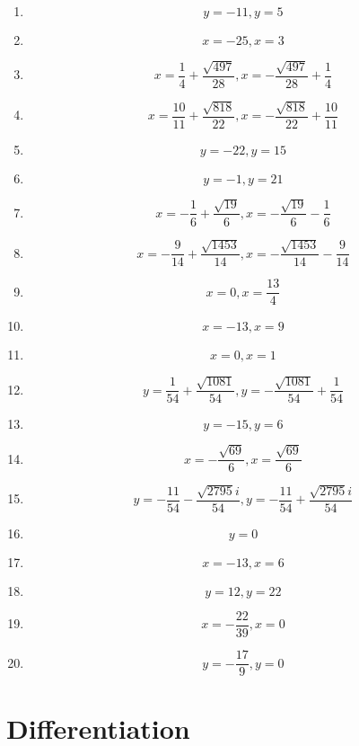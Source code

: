 \documentclass{article}
\begin{document}
        \begin{enumerate}
        \item$$y = -11, y = 5$$
\item$$x = -25, x = 3$$
\item$$x = \frac{1}{4} + \frac{\sqrt{497}}{28}, x = - \frac{\sqrt{497}}{28} + \frac{1}{4}$$
\item$$x = \frac{10}{11} + \frac{\sqrt{818}}{22}, x = - \frac{\sqrt{818}}{22} + \frac{10}{11}$$
\item$$y = -22, y = 15$$
\item$$y = -1, y = 21$$
\item$$x = - \frac{1}{6} + \frac{\sqrt{19}}{6}, x = - \frac{\sqrt{19}}{6} - \frac{1}{6}$$
\item$$x = - \frac{9}{14} + \frac{\sqrt{1453}}{14}, x = - \frac{\sqrt{1453}}{14} - \frac{9}{14}$$
\item$$x = 0, x = \frac{13}{4}$$
\item$$x = -13, x = 9$$
\item$$x = 0, x = 1$$
\item$$y = \frac{1}{54} + \frac{\sqrt{1081}}{54}, y = - \frac{\sqrt{1081}}{54} + \frac{1}{54}$$
\item$$y = -15, y = 6$$
\item$$x = - \frac{\sqrt{69}}{6}, x = \frac{\sqrt{69}}{6}$$
\item$$y = - \frac{11}{54} - \frac{\sqrt{2795} i}{54}, y = - \frac{11}{54} + \frac{\sqrt{2795} i}{54}$$
\item$$y = 0$$
\item$$x = -13, x = 6$$
\item$$y = 12, y = 22$$
\item$$x = - \frac{22}{39}, x = 0$$
\item$$y = - \frac{17}{9}, y = 0$$
        \end{enumerate}
        

        \section{Differentiation}
        
\end{document}
